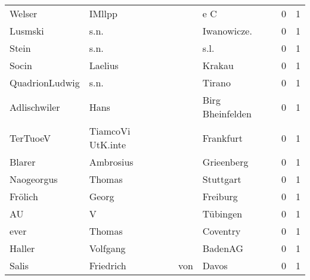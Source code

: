 \documentclass[10pt,a4paper,landscape]{article}
\begin{document}
\begin{longtable}{llllrr}
                   Welser &                             IMllpp &             &                                         e C &          0 &         1 \\
                  Lusmski &                               s.n. &             &                                Iwanowicze.  &          0 &         1 \\
                    Stein &                               s.n. &             &                                        s.l. &          0 &         1 \\
                    Socin &                            Laelius &             &                                      Krakau &          0 &         1 \\
           QuadrionLudwig &                               s.n. &             &                                      Tirano &          0 &         1 \\
             Adlischwiler &                               Hans &             &                            Birg Bheinfelden &          0 &         1 \\
                 TerTuoeV &                  TiamcoVi UtK.inte &             &                                   Frankfurt &          0 &         1 \\
                   Blarer &                          Ambrosius &             &                                  Grieenberg &          0 &         1 \\
               Naogeorgus &                             Thomas &             &                                   Stuttgart &          0 &         1 \\
                  Frölich &                              Georg &             &                                    Freiburg &          0 &         1 \\
                       AU &                                  V &             &                                    Tübingen &          0 &         1 \\
                     ever &                             Thomas &             &                                    Coventry &          0 &         1 \\
                   Haller &                           Volfgang &             &                                     BadenAG &          0 &         1 \\
                    Salis &                          Friedrich &         von &                                       Davos &          0 &         1 \\

\end{longtable}
\end{document}
